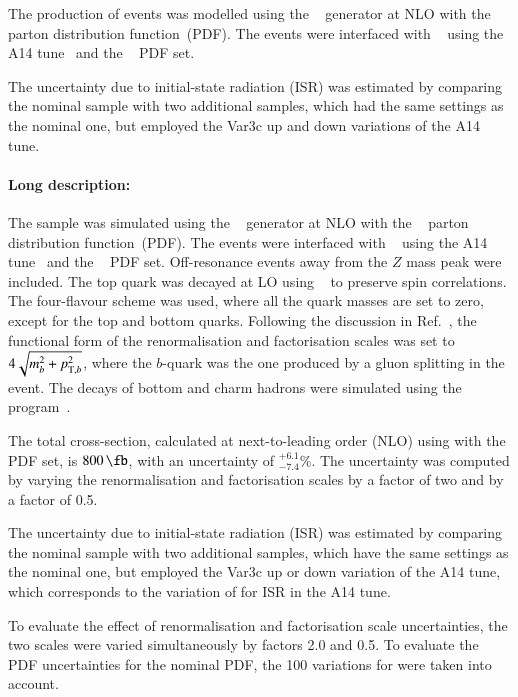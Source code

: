 The production of \tZq events was modelled using the \MGNLO[2.3.3]~\cite{Alwall:2014hca}
generator at NLO with the \NNPDF[3.0nlo]~\cite{Ball:2014uwa} parton distribution function~(PDF).
The events were interfaced with \PYTHIA[8.230]~\cite{Sjostrand:2014zea} using the A14 tune~\cite{ATL-PHYS-PUB-2014-021} and the
\NNPDF[2.3lo]~\cite{Ball:2014uwa} PDF set.

The uncertainty due to initial-state radiation (ISR) was estimated by comparing the nominal \tZq sample with two additional samples,
which had the same settings as the nominal one, but employed the Var3c up and down variations of the A14 tune.


\paragraph{Long description:}

The \tZq sample was simulated using the \MGNLO[2.3.3]~\cite{Alwall:2014hca}
generator at NLO with the \NNPDF[3.0nlo]~\cite{Ball:2014uwa} parton distribution function~(PDF). The events were interfaced with
\PYTHIA[8.230]~\cite{Sjostrand:2014zea} using the A14 tune~\cite{ATL-PHYS-PUB-2014-021}
and the \NNPDF[2.3lo]~\cite{Ball:2014uwa} PDF set. Off-resonance events away from the \(Z\) mass peak were included.
The top quark was decayed at LO using \MADSPIN~\cite{Frixione:2007zp,Artoisenet:2012st} to preserve spin correlations.
The four-flavour scheme was used, where all the quark masses are set to zero, except for the top and bottom quarks.
Following the discussion in Ref.~\cite{Frederix:2012dh}, the functional form of the renormalisation and factorisation scales
was set to \(4\sqrt{m_b^2+\pTX[2][b]}\), where the \(b\)-quark was the one produced by a gluon splitting in the event.
The decays of bottom and charm hadrons were simulated using the \EVTGEN program~\cite{Lange:2001uf}.

The \tZq total cross-section, calculated at next-to-leading order (NLO) using \MGNLO[2.3.3] with the \NNPDF[3.0nlo] PDF set,
is \(\SI{800}{\fb}\), with an uncertainty of \(^{+6.1}_{-7.4}\)\%. The uncertainty was computed by varying the renormalisation and
factorisation scales by a factor of two and by a factor of 0.5.

The uncertainty due to initial-state radiation (ISR) was estimated by comparing the nominal \tZq sample with two additional samples,
which have the same settings as the nominal one, but employed the Var3c up or down variation of the A14 tune, which
corresponds to the variation of \alphas for ISR in the A14 tune.

To evaluate the effect of renormalisation and factorisation scale uncertainties, the two scales were varied simultaneously by factors 2.0 and 0.5.
To evaluate the PDF uncertainties for the nominal PDF, the 100 variations for \NNPDF[2.3lo] were taken into account.
